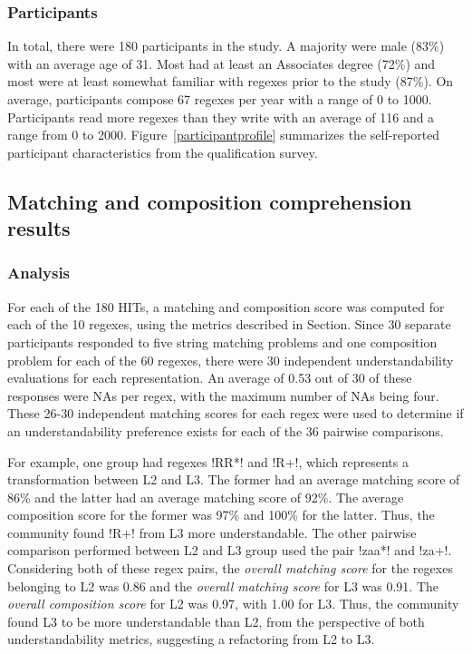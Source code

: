 \subsubsection{Participants}

In total, there were 180 participants in the study.
A majority were male (83\%) with an average age of 31. Most had
at least an Associates degree (72\%) and most were at least somewhat familiar with regexes prior to the study (87\%). On average,
participants compose 67 regexes per year with a range of 0 to 1000.
Participants read more regexes than they write with an average of 116 and a range from 0 to 2000.
Figure~\ref{participantprofile} summarizes the self-reported participant characteristics from the qualification survey.

\subsection{Matching and composition comprehension results}
\label{sec:comprehensionResults}



\subsubsection{Analysis}
For each of the 180 HITs, a matching and composition score was computed for each of the 10 regexes, using the metrics described in Section.  Since 30 separate participants responded to five string matching problems and one composition problem for each of the 60 regexes, there were 30 independent understandability evaluations for each representation.  An average of 0.53 out of 30 of these responses were NAs per regex, with the maximum number of NAs being four.  These 26-30 independent matching scores for each regex were used to determine if an understandability preference exists for each of the 36 pairwise comparisons.

For example, one group had regexes \cverb!RR*! and \cverb!R+!, which  represents a transformation between L2 and L3. The former had an average matching score of 86\% and the latter had an average matching score of 92\%. The average composition score for the former was 97\% and 100\% for the latter. Thus, the community found \cverb!R+! from L3 more understandable.
The other pairwise comparison performed between L2 and L3 group used the pair \cverb!zaa*! and \cverb!za+!.
Considering both of these regex pairs, the \emph{overall matching score} for the regexes belonging to L2 was 0.86 and the \emph{overall matching score} for L3 was 0.91.
The \emph{overall composition score} for L2 was 0.97, with 1.00 for L3. Thus, the community found L3 to be more understandable than L2, from the perspective of both understandability metrics, suggesting a refactoring from L2 to L3.

